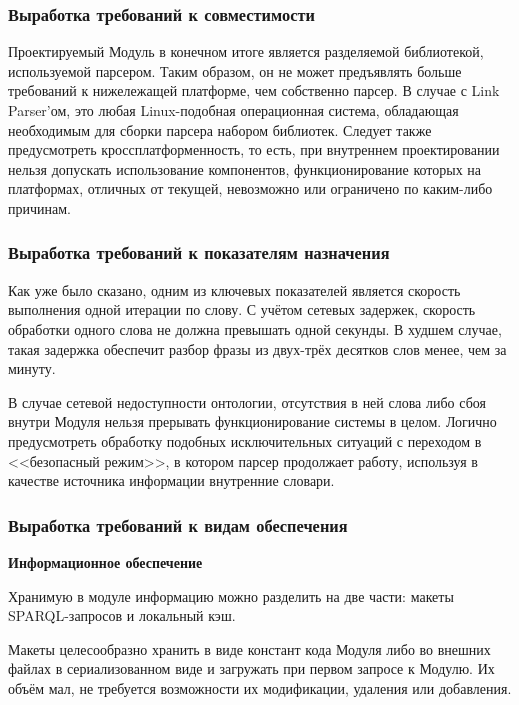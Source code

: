\subsubsection{Выработка требований к совместимости}

Проектируемый Модуль в конечном итоге является разделяемой библиотекой, используемой парсером. Таким образом, он не может предъявлять больше требований к нижележащей платформе, чем собственно парсер. В случае с Link Parser'ом, это любая Linux-подобная операционная система, обладающая необходимым для сборки парсера набором библиотек. Следует также предусмотреть кроссплатформенность, то есть, при внутреннем проектировании нельзя допускать использование компонентов, функционирование которых на платформах, отличных от текущей, невозможно или ограничено по каким-либо причинам.

\subsubsection{Выработка требований к показателям назначения}

Как уже было сказано, одним из ключевых показателей является скорость выполнения одной итерации по слову. С учётом сетевых задержек, скорость обработки одного слова не должна превышать одной секунды. В худшем случае, такая задержка обеспечит разбор фразы из двух-трёх десятков слов менее, чем за минуту.

В случае сетевой недоступности онтологии, отсутствия в ней слова либо сбоя внутри Модуля нельзя прерывать функционирование системы в целом. Логично предусмотреть обработку подобных исключительных ситуаций с переходом в <<безопасный режим>>, в котором парсер продолжает работу, используя в качестве источника информации внутренние словари.

\subsubsection{Выработка требований к видам обеспечения}

\textbf{Информационное обеспечение}

Хранимую в модуле информацию можно разделить на две части: макеты SPARQL-запросов и локальный кэш. 

Макеты целесообразно хранить в виде констант кода Модуля либо во внешних файлах в сериализованном виде и загружать при первом запросе к Модулю. Их объём мал, не требуется возможности их модификации, удаления или добавления.

